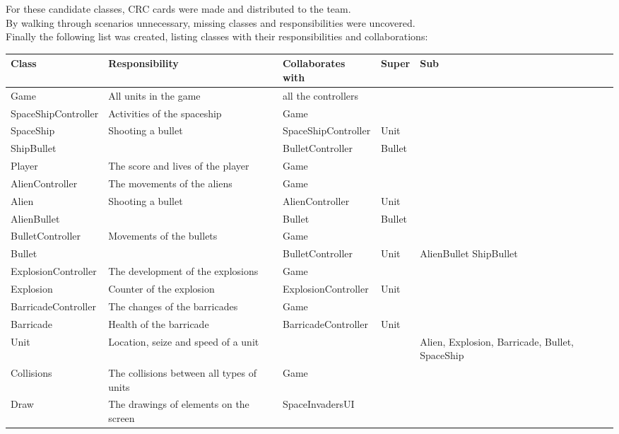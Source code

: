 \documentclass[10pt]{article}
\begin{document}
 \pagebreak
For these candidate classes, CRC cards were made and distributed to the team. \\
By walking through scenarios unnecessary, missing classes and responsibilities were uncovered.\\
Finally the following list was created, listing classes with their responsibilities and collaborations:
\begin{center}
   \hspace*{-0.75in}\begin{tabular}{ | p{3cm} | p{5cm} | p{3cm} | p{2cm} | p{2cm} |}
  \hline
    Class & Responsibility & Collaborates with & Super & Sub \\ \hline
   Game & All units in the game & all the controllers & & \\ \hline
   SpaceShipController & Activities of the spaceship & Game & & \\ \hline
  SpaceShip & Shooting a bullet & SpaceShipController & Unit & \\ \hline
  ShipBullet& & BulletController & Bullet & \\ \hline
   Player & The score and lives of the player & Game & & \\ \hline
  AlienController & The movements of the aliens & Game & &  \\  \hline
   Alien & Shooting a bullet  & AlienController & Unit &  \\  \hline
   AlienBullet & & Bullet & Bullet &  \\  \hline
   BulletController & Movements of the bullets & Game & &  \\  \hline
   Bullet & &  BulletController & Unit & AlienBullet ShipBullet \\  \hline
   ExplosionController & The development of the explosions & Game & &  \\  \hline
  Explosion & Counter of the explosion & ExplosionController & Unit &  \\  \hline
  BarricadeController & The changes of the barricades & Game & &  \\  \hline
  Barricade & Health of the barricade & BarricadeController & Unit &  \\  \hline
  Unit & Location, seize and speed of a unit &  & & Alien, Explosion, Barricade, Bullet, SpaceShip  \\  \hline
  Collisions & The collisions between all types of units  & Game & &  \\  \hline
  Draw  & The drawings of elements on the screen & SpaceInvadersUI & &  \\  \hline

\end{tabular}
\end{center}
\end{document}
